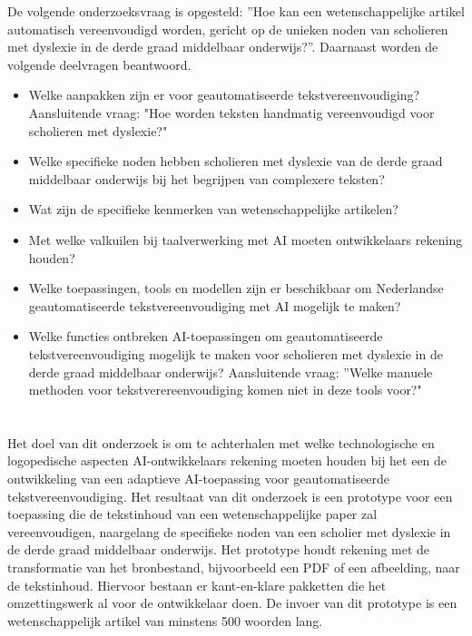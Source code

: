De volgende onderzoeksvraag is opgesteld: ”Hoe kan een wetenschappelijke artikel automatisch vereenvoudigd worden, gericht op de unieken noden van scholieren met dyslexie in de derde graad middelbaar onderwijs?”. Daarnaast worden de volgende deelvragen beantwoord.

\begin{itemize}
\item Welke aanpakken zijn er voor geautomatiseerde tekstvereenvoudiging? Aansluitende vraag: "Hoe worden teksten handmatig vereenvoudigd voor scholieren met dyslexie?"
\item Welke specifieke noden hebben scholieren met dyslexie van de derde graad middelbaar onderwijs bij het begrijpen van complexere teksten?
\item Wat zijn de specifieke kenmerken van wetenschappelijke artikelen?
\item Met welke valkuilen bij taalverwerking met AI moeten ontwikkelaars rekening houden?
\item Welke toepassingen, tools en modellen zijn er beschikbaar om Nederlandse geautomatiseerde tekstvereenvoudiging met AI mogelijk te maken?
\item Welke functies ontbreken AI-toepassingen om geautomatiseerde tekstvereenvoudiging mogelijk te maken voor scholieren met dyslexie in de derde graad middelbaar onderwijs? Aansluitende vraag: ”Welke manuele methoden voor tekstverereenvoudiging komen niet in deze tools voor?"
\end{itemize}


\section{}%
\label{sec:onderzoeksdoelstelling}


Het doel van dit onderzoek is om te achterhalen met welke technologische en logopedische aspecten AI-ontwikkelaars rekening moeten houden bij het een de ontwikkeling van een adaptieve AI-toepassing voor geautomatiseerde tekstvereenvoudiging. Het resultaat van dit onderzoek is een prototype voor een toepassing die de tekstinhoud van een wetenschappelijke paper zal vereenvoudigen, naargelang de specifieke noden van een scholier met dyslexie in de derde graad middelbaar onderwijs. Het prototype houdt rekening met de transformatie van het bronbestand, bijvoorbeeld een PDF of een afbeelding, naar de tekstinhoud. Hiervoor bestaan er kant-en-klare pakketten die het omzettingswerk al voor de ontwikkelaar doen. De invoer van dit prototype is een wetenschappelijk artikel van minstens 500 woorden lang.

